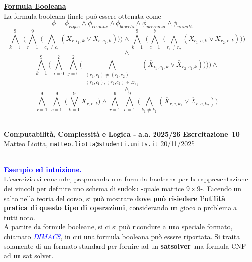 \documentclass[a4paper,10pt]{article}
\makeatletter
\newcommand{\EsercitazioneNum}{10}
\newcommand{\Data}{20/11/2025}
\newcommand{\DocType}{Esercitazione} %
\newcommand{\FullTitle}{\DocType\ \EsercitazioneNum}
\newcommand{\Header}{
\noindent
  \small \textbf{Computabilità, Complessità e Logica - a.a. 2025/26} \hfill \textbf{\FullTitle} \\[0.2cm]
  \scriptsize Matteo Liotta, \texttt{matteo.liotta@studenti.units.it} \hfill \Data \\[0.2cm]
  \noindent\makebox[\linewidth]{\rule{\linewidth}{0.4pt}} \\[0.3cm]}
\newcommand{\NewPageHeader}{
  \vfill
  \noindent\makebox[\linewidth]{\rule{\linewidth}{0.4pt}}
  \newpage
  {\Header}
}
\makeatother
\begin{document}
{\begin{itemize}[label=, leftmargin=0pt]
\begin{osservazioni}
\underline{\textbf{Formula Booleana}}\\
La formula booleana finale può essere ottenuta come 
$$\phi=\phi_{righe}\land \phi_{colonne}\land \phi_{blocchi}\land \phi_{presenza} \land \phi_{unicità}=$$
$$\bigwedge\limits_{k=1}^{9}\ \bigg(\bigwedge\limits_{r=1}^{9}\ \bigg( 
    \bigwedge\limits_{c_1\ne c_2} (\overline X_{r,c_1,k} \lor \overline X_{r,c_2,k})
    \bigg)\bigg) \land 
    \bigwedge\limits_{k=1}^{9}\ \bigg(\bigwedge\limits_{c=1}^{9}\ \bigg( 
    \bigwedge\limits_{r_1\ne r_2} (\overline X_{r_1,c,k} \lor \overline X_{r_2,c,k})
    \bigg)\bigg)$$
    $$\land$$
    $$\bigwedge\limits_{k=1}^9\bigg(\ \bigwedge\limits_{i=0}^2\ \bigwedge\limits_{j=0}^2\bigg(\bigwedge\limits_{\begin{array}{c}
         (r_1,c_1)\ne(r_2,c_2)\\
         (r_1,c_1),(r_2,c_2)\in B_{i,j}
    \end{array}} (\overline X_{r_1,c_1,k} \lor \overline X_{r_2,c_2,k})
    \bigg)\bigg)\bigg)\land $$
    $$\land$$
    $$\bigwedge\limits_{r=1}^{9}\ \bigwedge\limits_{c=1}^{9}\ \bigg( 
    \bigvee\limits_{k=1}^9 X_{r,c,k}
    \bigg)\land \bigwedge\limits_{r=1}^{9}\ \bigwedge\limits_{c=1}^{9}\ \bigg( 
    \bigwedge\limits_{k_1\ne k_2} ( \overline X_{r,c,k_1} \lor\overline X_{r,c,k_2} )
    \bigg)$$\\
\end{osservazioni}



\NewPageHeader

\begin{osservazioni2} 

\underline{\textbf{\textcolor{blue}{Esempio ed intuizione.}}}\\

L'esercizio si conclude, proponendo una formula booleana per la rappresentazione dei vincoli per definire uno schema di sudoku -quale matrice $9\times 9$-. Facendo un salto nella teoria del corso, si può mostrare \textbf{dove può risiedere l'utilità pratica di questo tipo di operazioni}, considerando un gioco o problema a tutti noto. \\

A partire da formule booleane, si ci si può ricondure a uno speciale formato, chiamato \href{https://jix.github.io/varisat/manual/0.2.0/formats/dimacs.html}{\textit{\textcolor{blue}{\underline{DIMACS}}}}, in cui una formula booleana può essere riportata. Si tratta solamente di un formato standard per fornire ad un \textbf{satsolver} una formula CNF ad un sat solver.\\


\end{osservazioni2}
\end{itemize}}
\end{document}
